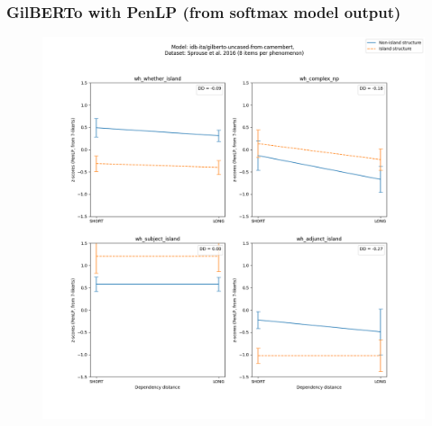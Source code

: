 \subsubsection{GilBERTo with PenLP (from softmax model output)}
\begin{figure}[h]
	\centering
	\includegraphics[width=1\textwidth]{images/AppendixA/Sprouse_wh_idb-ita_gilberto-uncased-from-camembert_PenLP-zscores-likert-2022-07-11.png} 
\end{figure}

\clearpage
